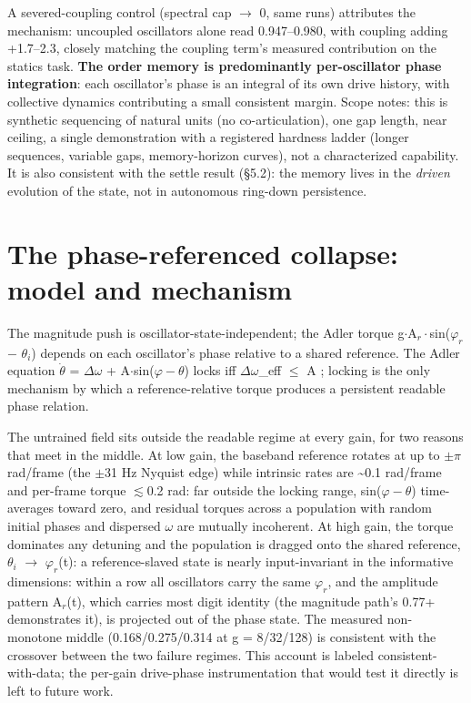 \documentclass[10pt]{article}
\makeatletter
\newcommand{\tmlr@floatbarrier}{\par\vspace{\z@}%
  \ifx\@deferlist\@empty\else\clearpage\fi}
\let\tmlr@section\section
\renewcommand{\section}{\tmlr@floatbarrier\tmlr@section}
\makeatother
\begin{document}
A severed-coupling control (spectral cap \ensuremath{\to} 0, same runs)
attributes the mechanism: uncoupled oscillators alone read 0.947--0.980,
with coupling adding +1.7--2.3, closely matching the coupling term's
measured contribution on the statics task. \textbf{The order memory is
predominantly per-oscillator phase integration}: each oscillator's phase
is an integral of its own drive history, with collective dynamics
contributing a small consistent margin. Scope notes: this is synthetic
sequencing of natural units (no co-articulation), one gap length, near
ceiling, a single demonstration with a registered hardness ladder
(longer sequences, variable gaps, memory-horizon curves), not a
characterized capability. It is also consistent with the settle result
(§5.2): the memory lives in the \emph{driven} evolution of the state,
not in autonomous ring-down persistence.

\section{The phase-referenced collapse: model and
mechanism}\label{the-phase-referenced-collapse-model-and-mechanism}

The magnitude push is oscillator-state-independent; the Adler torque
g\ensuremath{\cdot}A\ensuremath{_{r}\cdot}sin(\ensuremath{\varphi_{r}}
\ensuremath{-} \ensuremath{\theta_{i}}) depends on each oscillator's
phase relative to a shared reference. The Adler equation
\ensuremath{\dot{\theta}} = \ensuremath{\Delta\omega} +
A\ensuremath{\cdot}sin(\ensuremath{\varphi-\theta}) locks iff
\textbar{}\ensuremath{\Delta\omega}\_eff\textbar{} \ensuremath{\leq} A
\citep{adler1946}; locking is the only mechanism by which a
reference-relative torque produces a persistent readable phase relation.

The untrained field sits outside the readable regime at every gain, for
two reasons that meet in the middle. At low gain, the baseband reference
rotates at up to \ensuremath{\pm\pi} rad/frame (the \ensuremath{\pm}31
Hz Nyquist edge) while intrinsic rates are \textasciitilde0.1 rad/frame
and per-frame torque \ensuremath{\lesssim}0.2 rad: far outside the
locking range, sin(\ensuremath{\varphi-\theta}) time-averages toward
zero, and residual torques across a population with random initial
phases and dispersed \ensuremath{\omega} are mutually incoherent. At
high gain, the torque dominates any detuning and the population is
dragged onto the shared reference, \ensuremath{\theta_{i}}
\ensuremath{\to} \ensuremath{\varphi_{r}}(t): a reference-slaved state
is nearly input-invariant in the informative dimensions: within a row
all oscillators carry the same \ensuremath{\varphi_{r}}, and the
amplitude pattern A\ensuremath{_{r}}(t), which carries most digit
identity (the magnitude path's 0.77+ demonstrates it), is projected out
of the phase state. The measured non-monotone middle (0.168/0.275/0.314
at g = 8/32/128) is consistent with the crossover between the two
failure regimes. This account is labeled consistent-with-data; the
per-gain drive-phase instrumentation that would test it directly is left
to future work.
\end{document}
